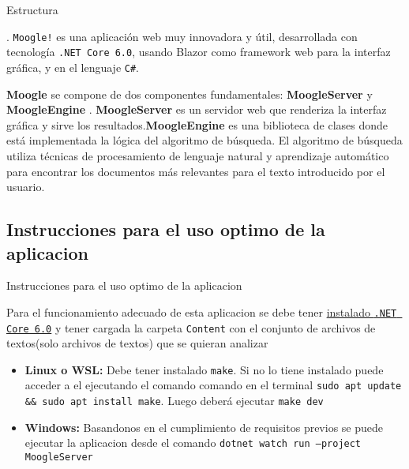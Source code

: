 \documentclass{beamer}
\begin{document}
\begin{frame}{Estructura}
    \begin{center}
       .
\texttt{Moogle!} es una aplicación web muy innovadora y útil, desarrollada con tecnología {\tt .NET Core 6.0}, usando Blazor como framework web para la interfaz gráfica, y en el lenguaje {\tt C\#}.

{ \bf Moogle} se compone de dos componentes fundamentales: {\bf MoogleServer} y {\bf  MoogleEngine}
. {\bf  MoogleServer} es un servidor web que renderiza la interfaz gráfica y sirve los resultados.{\bf MoogleEngine} es una biblioteca de clases donde está implementada la lógica del algoritmo de búsqueda.
 El algoritmo de búsqueda utiliza técnicas de procesamiento de lenguaje natural y aprendizaje
 automático para encontrar los documentos más relevantes para el texto introducido por el usuario.

     \end{center}
\end{frame}

\subsection*{Instrucciones para el uso optimo de la aplicacion}

\begin{frame}{Instrucciones para el uso optimo de la aplicacion}
    \begin{center}
        Para el funcionamiento adecuado de esta aplicacion se debe tener 
\href{https://learn.microsoft.com/es-es/dotnet/core/install/}{instalado {\tt .NET Core 6.0}} y tener cargada  la carpeta {\tt Content}  con el conjunto de archivos de textos(solo archivos de textos) que se quieran analizar 

\begin{itemize}
	\item {\bf Linux o WSL:} Debe tener instalado {\tt  make}. Si no lo tiene instalado
	      puede acceder a el ejecutando el comando comando en el terminal {\tt sudo apt update \&\& sudo apt install make}. Luego deberá ejecutar {\tt make dev}

	\item {\bf Windows:} Basandonos en el cumplimiento de requisitos previos se puede ejecutar la aplicacion desde el comando  {\tt dotnet watch run --project MoogleServer}
\end{itemize}

    \end{center}
\end{frame}
\end{document}
